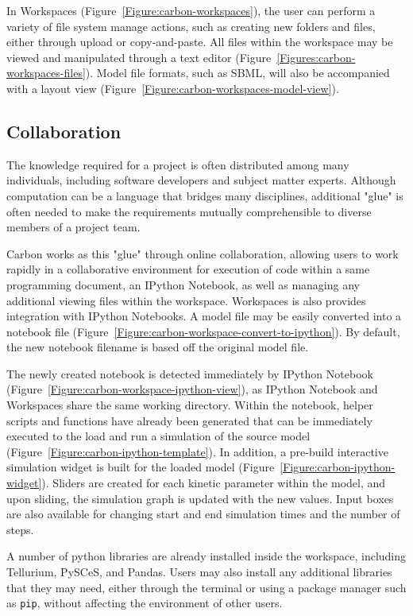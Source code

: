 In Workspaces (Figure~\ref{Figure:carbon-workspaces}), the user can perform a variety of file system manage actions, such as creating new folders and files, either through upload or copy-and-paste.
All files within the workspace may be viewed and manipulated through a text editor (Figure~\ref{Figures:carbon-workspaces-files}).
Model file formats, such as SBML, will also be accompanied with a layout view (Figure~\ref{Figure:carbon-workspaces-model-view}).

\subsection{Collaboration}
The knowledge required for a project is often distributed among many individuals, including software developers and subject matter experts. \autocite{ragan2013collaborative}
Although computation can be a language that bridges many disciplines, additional "glue" is often needed to make the requirements mutually comprehensible to diverse members of a project team.

Carbon works as this "glue" through online collaboration, allowing users to work rapidly in a collaborative environment for execution of code within a same programming document, an IPython Notebook, as well as managing any additional viewing files within the workspace.
Workspaces is also provides integration with IPython Notebooks.
A model file may be easily converted into a notebook file (Figure~\ref{Figure:carbon-workspace-convert-to-ipython}).
By default, the new notebook filename is based off the original model file.

The newly created notebook is detected immediately by IPython Notebook (Figure~\ref{Figure:carbon-workspace-ipython-view}), as IPython Notebook and Workspaces share the same working directory.
Within the notebook, helper scripts and functions have already been generated that can be immediately executed to the load and run a simulation of the source model (Figure~\ref{Figure:carbon-ipython-template}).
In addition, a pre-build interactive simulation widget is built for the loaded model (Figure~\ref{Figure:carbon-ipython-widget}).
Sliders are created for each kinetic parameter within the model, and upon sliding, the simulation graph is updated with the new values.
Input boxes are also available for changing start and end simulation times and the number of steps.

A number of python libraries are already installed inside the workspace, including Tellurium, PySCeS, and Pandas.
Users may also install any additional libraries that they may need, either through the terminal or using a package manager such as \texttt{pip}, without affecting the environment of other users.



